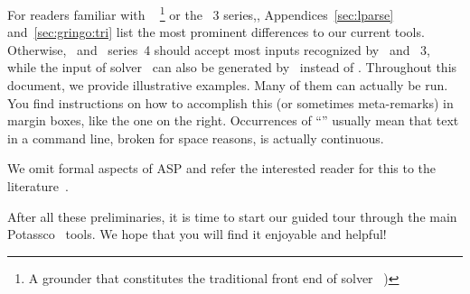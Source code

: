 
For readers familiar with \lparse~\cite{lparseManual}%
\footnote{A grounder that constitutes the traditional front end of solver \smodels~\cite{siniso02a})}
or the \gringo~3 series,,
Appendices~\ref{sec:lparse} and~\ref{sec:gringo:tri}
list the most prominent differences to our current tools.
Otherwise, \gringo\ and \clingo\ series~4 should accept most inputs recognized by \lparse\ and \gringo~3,
while the input of solver \clasp\ can also be generated by \lparse\ instead of \gringo.
Throughout this document, we provide illustrative examples.
Many of them can actually be run. 
You find instructions on how to accomplish this
(or sometimes meta-remarks)
in margin boxes, like the one on the right.
Occurrences of ``''
usually mean that text in a command line, broken for space reasons, is actually continuous.

We omit formal aspects of ASP and refer the interested reader for this to the literature~\cite{baral02a,gelkah14a,gekakasc12a}.

After all these preliminaries, it is time to start our guided tour
through the main Potassco~\cite{potassco} tools.
We hope that you will find it enjoyable and helpful!

